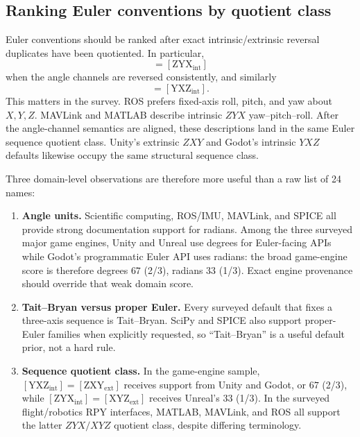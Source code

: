 \documentclass[11pt]{article}
\begin{document}
    \subsection{Ranking Euler conventions by quotient class}

    Euler conventions should be ranked after exact intrinsic/extrinsic reversal duplicates
    have been quotiented. In particular,
    \begin{equation}
        [\mathrm{XYZ}_{\mathrm{ext}}]
    =
    [\mathrm{ZYX}_{\mathrm{int}}]
    \label{eq:euler-rpy-survey-class}
    \end{equation}
    when the angle channels are reversed consistently, and similarly
    \begin{equation}
        [\mathrm{ZXY}_{\mathrm{ext}}]
    =
    [\mathrm{YXZ}_{\mathrm{int}}].
    \label{eq:euler-yxz-survey-class}
    \end{equation}
    This matters in the survey. ROS prefers fixed-axis roll, pitch, and yaw about
    $X,Y,Z$. MAVLink and MATLAB describe intrinsic $ZYX$ yaw--pitch--roll. After the
    angle-channel semantics are aligned, these descriptions land in the same Euler sequence
    quotient class. Unity's extrinsic
    $ZXY$ and Godot's intrinsic $YXZ$ defaults likewise occupy the same structural sequence
    class.

    Three domain-level observations are therefore more useful than a raw list of 24 names:
    \begin{enumerate}[nosep]
    \item \textbf{Angle units.}  Scientific computing, ROS/IMU, MAVLink, and SPICE all
    provide strong documentation support for radians. Among the three surveyed
    major game engines, Unity and Unreal use degrees for Euler-facing APIs while
    Godot's programmatic Euler API uses radians: the broad game-engine score is
    therefore degrees $67$ (2/3), radians $33$ (1/3). Exact engine provenance
    should override that weak domain score.
    \item \textbf{Tait--Bryan versus proper Euler.}  Every surveyed default that fixes a
    three-axis sequence is Tait--Bryan. SciPy and SPICE also support proper-Euler
    families when explicitly requested, so ``Tait--Bryan'' is a useful default
    prior, not a hard rule.
    \item \textbf{Sequence quotient class.}  In the game-engine sample,
    $[\mathrm{YXZ}_{\mathrm{int}}]=[\mathrm{ZXY}_{\mathrm{ext}}]$ receives support
    from Unity and Godot, or $67$ (2/3), while
    $[\mathrm{ZYX}_{\mathrm{int}}]=[\mathrm{XYZ}_{\mathrm{ext}}]$ receives Unreal's
    $33$ (1/3). In the surveyed flight/robotics RPY interfaces, MATLAB,
    MAVLink, and ROS all support the latter $ZYX/XYZ$ quotient class, despite
    differing terminology.
    \end{enumerate}
\end{document}
